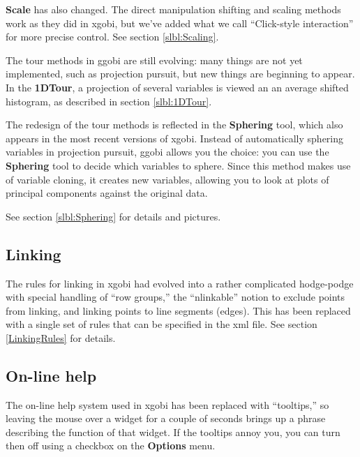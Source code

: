 \documentclass[11pt]{article}
\begin{document}
{\bf Scale} has also changed.  The direct manipulation shifting and
scaling methods work as they did in xgobi, but we've added  what we
call ``Click-style interaction'' for more precise control.  See section
\ref{slbl:Scaling}.

The tour methods in ggobi are still evolving:  many things are not
yet implemented, such as projection pursuit, but new things are
beginning to appear.  In the {\bf 1DTour}, a projection of several
variables is viewed an an average shifted histogram, as described
in section \ref{slbl:1DTour}.

The redesign of the tour methods is reflected in the {\bf Sphering}
tool, which also appears in the most recent versions of xgobi.
Instead of automatically sphering variables in projection pursuit,
ggobi allows you the choice:  you can use the {\bf Sphering} tool to
decide which variables to sphere.  Since this method makes use of
variable cloning, it creates new variables, allowing you to look at
plots of principal components against the original data.

See section \ref{slbl:Sphering} for details and pictures.

\subsection{Linking}

The rules for linking in xgobi had evolved into a rather complicated
hodge-podge with special handling of ``row groups,'' the
``nlinkable'' notion to exclude points from linking, and linking
points to line segments (edges).  This has been replaced with a single set
of rules that can be specified in the xml file.  See section 
\ref{LinkingRules} for details.

\subsection{On-line help}

The on-line help system used in xgobi has been replaced with
``tooltips,'' so leaving the mouse over a widget for a couple of
seconds brings up a phrase describing the function of that widget.
If the tooltips annoy you, you can turn then off using a
checkbox on the {\bf Options} menu.

\newpage
%
\end{document}
